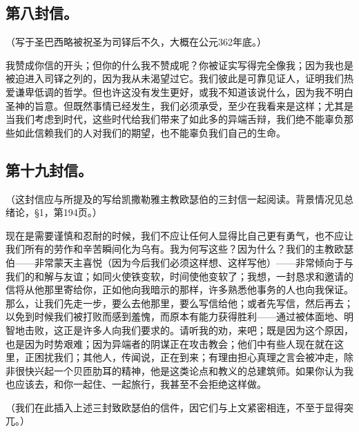 
\subsection{第八封信。}

（写于圣巴西略被祝圣为司铎后不久，大概在公元362年底。）\par

我赞成你信的开头；但你的什么我不赞成呢？你被证实写得完全像我；因为我也是被迫进入司铎之列的，因为我从未渴望过它。我们彼此是可靠见证人，证明我们热爱谦卑低调的哲学。但也许这没有发生更好，或我不知道该说什么，因为我不明白圣神的旨意。但既然事情已经发生，我们必须承受，至少在我看来是这样；尤其是当我们考虑到时代，这些时代给我们带来了如此多的异端舌辩，我们绝不能辜负那些如此信赖我们的人对我们的期望，也不能辜负我们自己的生命。\par


\subsection{第十九封信。}

（这封信应与所提及的写给凯撒勒雅主教欧瑟伯的三封信一起阅读。背景情况见总绪论，§1，第194页。）\par

现在是需要谨慎和忍耐的时候，我们不应让任何人显得比自己更有勇气，也不应让我们所有的劳作和辛苦瞬间化为乌有。我为何写这些？因为什么？我们的主教欧瑟伯——非常蒙天主喜悦（因为今后我们必须这样想、这样写他）——非常倾向于与我们的和解与友谊；如同火使铁变软，时间使他变软了；我想，一封恳求和邀请的信将从他那里寄给你，正如他向我暗示的那样，许多熟悉他事务的人也向我保证。那么，让我们先走一步，要么去他那里，要么写信给他；或者先写信，然后再去；以免到时候我们被打败而感到羞愧，而原本有能力获得胜利——通过被体面地、明智地击败，这正是许多人向我们要求的。请听我的劝，来吧；既是因为这个原因，也是因为时势艰难；因为异端者的阴谋正在攻击教会；他们中有些人现在就在这里，正困扰我们；其他人，传闻说，正在到来；有理由担心真理之言会被冲走，除非很快兴起一个贝匝肋耳的精神，他是这类论点和教义的总建筑师。如果你认为我也应该去，和你一起住、一起旅行，我甚至不会拒绝这样做。\par

（我们在此插入上述三封致欧瑟伯的信件，因它们与上文紧密相连，不至于显得突兀。）\par

